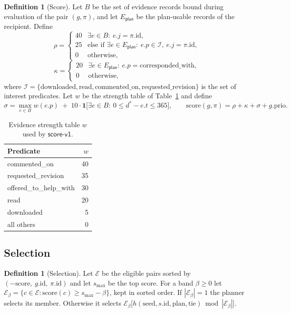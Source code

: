 \documentclass[11pt]{article}
\theoremstyle{definition}
\newtheorem{definition}[theorem]{Definition}
\theoremstyle{remark}
\newcommand{\planuse}{\mathsf{plan}}
\begin{document}
\begin{definition}[Score]\label{def:score}
Let $B$ be the set of evidence records bound during evaluation of the pair $(g,\pi)$, and let $E_{\planuse}$ be the plan-usable records of the recipient. Define
\[
\rho=\begin{cases}40&\exists e\in B:\ e.j=\pi.\mathrm{id},\\25&\text{else if }\exists e\in E_{\planuse}:\ e.p\in\mathcal{I},\ e.j=\pi.\mathrm{id},\\0&\text{otherwise,}\end{cases}
\]
\[
\kappa=\begin{cases}20&\exists e\in E_{\planuse}:\ e.p=\text{corresponded\_with},\\0&\text{otherwise,}\end{cases}
\]
where $\mathcal{I}=\{\text{downloaded},\text{read},\text{commented\_on},\text{requested\_revision}\}$ is the set of interest predicates. Let $w$ be the strength table of Table~\ref{tab:strength} and define
\[
\sigma=\max_{e\in B}w(e.p)\;+\;10\cdot\mathbf{1}\bigl[\exists e\in B:\ 0\le d^\ast-e.t\le365\bigr],\qquad
\mathrm{score}(g,\pi)=\rho+\kappa+\sigma+g.\mathrm{prio}.
\]
\end{definition}

\begin{table}[H]
\centering
\caption{Evidence strength table $w$ used by $\mathsf{score\text{-}v1}$.}\label{tab:strength}
\begin{tabular}{lr}
\toprule
Predicate & $w$\\
\midrule
commented\_on & 40\\
requested\_revision & 35\\
offered\_to\_help\_with & 30\\
read & 20\\
downloaded & 5\\
all others & 0\\
\bottomrule
\end{tabular}
\end{table}

\subsection{Selection}

\begin{definition}[Selection]\label{def:select}
Let $\mathcal{E}$ be the eligible pairs sorted by $(-\mathrm{score},\ g.\mathrm{id},\ \pi.\mathrm{id})$ and let $s_{\max}$ be the top score. For a band $\beta\ge0$ let $\mathcal{E}_\beta=\{c\in\mathcal{E}:\mathrm{score}(c)\ge s_{\max}-\beta\}$, kept in sorted order. If $|\mathcal{E}_\beta|=1$ the planner selects its member. Otherwise it selects $\mathcal{E}_\beta\bigl[h(\mathrm{seed},s.\mathrm{id},\text{plan},\text{tie})\bmod|\mathcal{E}_\beta|\bigr]$.
\end{definition}
\end{document}
